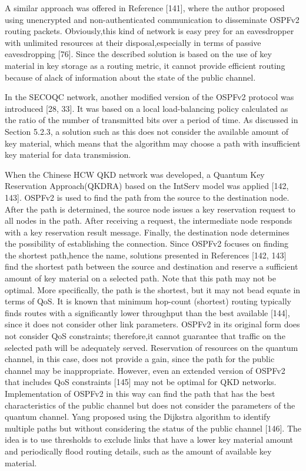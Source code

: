 A similar approach was offered in Reference [141], where the author proposed using unencrypted and non-authenticated communication to disseminate OSPFv2 routing packets. Obviously,this kind of network is easy prey for an eavesdropper with unlimited resources at their disposal,especially in terms of passive eavesdropping [76]. Since the described solution is based on the use of key material in key storage as a routing metric, it cannot provide efficient routing because of alack of information about the state of the public channel.

In the SECOQC network, another modified version of the OSPFv2 protocol was introduced [28,
33]. It was based on a local load-balancing policy calculated as the ratio of the number of transmitted bits over a period of time. As discussed in Section 5.2.3, a solution such as this does not consider the available amount of key material, which means that the algorithm may choose a path with insufficient key material for data transmission.

When the Chinese HCW QKD network was developed, a Quantum Key Reservation Approach(QKDRA) based on the IntServ model was applied [142, 143]. OSPFv2 is used to find the path from the source to the destination node. After the path is determined, the source node issues a key reservation request to all nodes in the path. After receiving a request, the intermediate node responds with a key reservation result message. Finally, the destination node determines the possibility of establishing the connection. Since OSPFv2 focuses on finding the shortest path,hence the name, solutions presented in References [142, 143] find the shortest path between the source and destination and reserve a sufficient amount of key material on a selected path. Note that this path may not be optimal. More specifically, the path is the shortest, but it may not bead equate in terms of QoS. It is known that minimum hop-count (shortest) routing typically finds routes with a significantly lower throughput than the best available [144], since it does not consider other link parameters. OSPFv2 in its original form does not consider QoS constraints; therefore,it cannot guarantee that traffic on the selected path will be adequately served. Reservation of resources on the quantum channel, in this case, does not provide a gain, since the path for the public channel may be inappropriate. However, even an extended version of OSPFv2 that includes QoS constraints [145] may not be optimal for QKD networks. Implementation of OSPFv2 in this way can find the path that has the best characteristics of the public channel but does not consider the parameters of the quantum channel.
Yang proposed using the Dijkstra algorithm to identify multiple paths but without considering the status of the public channel [146]. The idea is to use thresholds to exclude links that have a lower key material amount and periodically flood routing details, such as the amount of available key material.

